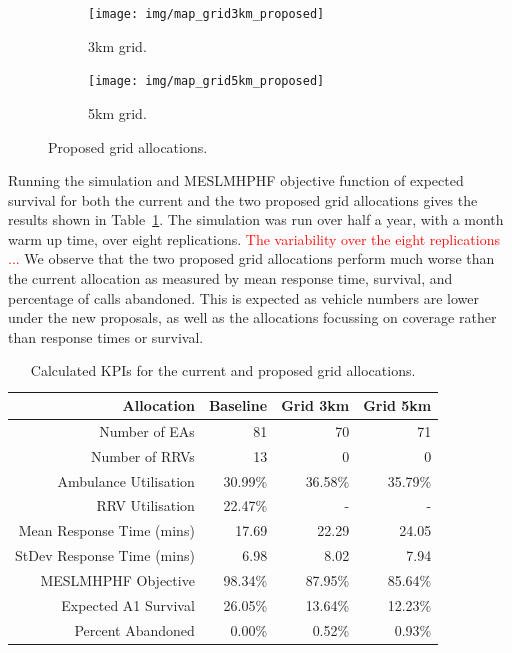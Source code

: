 \documentclass[numbers,webpdf,imaman]{ima-authoring-template}%
\begin{document}
\begin{figure}
\begin{center}
\begin{subfigure}{0.37\textwidth}
\texttt{[image: img/map\_grid3km\_proposed]}
\caption{3km grid.}
\end{subfigure}
\hspace{8mm}
\begin{subfigure}{0.37\textwidth}
\texttt{[image: img/map\_grid5km\_proposed]}
\caption{5km grid.}
\end{subfigure}
\caption{Proposed grid allocations.}
\label{fig:grid_allocations}
\end{center}
\end{figure}

Running the simulation and MESLMHPHF objective function of expected survival for
both the current and the two proposed grid allocations gives the results shown
in Table~\ref{tbl:current_grid_results}. The simulation was run over half a
year, with a month warm up time, over eight replications. 
\textcolor{red}{The variability over the eight replications ...}
We observe that the
two proposed grid allocations perform much worse than the current allocation as
measured by mean response time, survival, and percentage of calls abandoned.
This is expected as vehicle numbers are lower under the new proposals, as well
as the allocations focussing on coverage rather than response times or survival.

\begin{table}
\begin{tabular}{rrrr}
\toprule
Allocation & Baseline & Grid 3km & Grid 5km \\
\midrule
Number of EAs & 81 & 70 & 71 \\
Number of RRVs & 13 & 0 & 0 \\
Ambulance Utilisation & 30.99\% & 36.58\% & 35.79\% \\
RRV Utilisation & 22.47\% & - & - \\
Mean Response Time (mins) & 17.69 & 22.29 & 24.05 \\
StDev Response Time (mins) & 6.98 & 8.02 & 7.94 \\
MESLMHPHF Objective & 98.34\% & 87.95\% & 85.64\% \\
Expected A1 Survival & 26.05\% & 13.64\% & 12.23\% \\
Percent Abandoned & 0.00\% & 0.52\% & 0.93\% \\
\bottomrule
\end{tabular}
\caption{Calculated KPIs for the current and proposed grid allocations.}
\label{tbl:current_grid_results}
\end{table}
\end{document}
